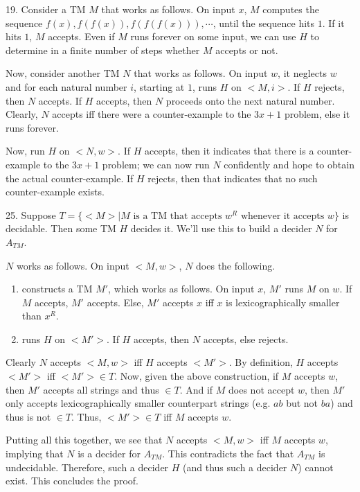 \documentclass{article}
\begin{document}
19. Consider a TM $M$ that works as follows. On input $x$, $M$ computes the sequence $f(x), f(f(x)), f(f(f(x))), \cdots$, until the sequence hits $1$. If it hits $1$, $M$ accepts. Even if $M$ runs forever on some input, we can use $H$ to determine in a finite number of steps whether $M$ accepts or not.

Now, consider another TM $N$ that works as follows. On input $w$, it neglects $w$ and for each natural number $i$, starting at $1$, runs $H$ on $<M, i>$. If $H$ rejects, then $N$ accepts. If $H$ accepts, then $N$ proceeds onto the next natural number. Clearly, $N$ accepts iff there were a counter-example to the $3x + 1$ problem, else it runs forever.

Now, run $H$ on $<N, w>$. If $H$ accepts, then it indicates that there is a counter-example to the $3x + 1$ problem; we can now run $N$ confidently and hope to obtain the actual counter-example. If $H$ rejects, then that indicates that no such counter-example exists.

25. Suppose $T = \{<M> \mid M \text{ is a TM that accepts } w^R \text{ whenever it accepts } w \}$ is decidable. Then some TM $H$ decides it. We'll use this to build a decider $N$ for $A_{TM}$.

$N$ works as follows. On input $<M, w>$, $N$ does the following.

\begin{enumerate}
    \item constructs a TM $M'$, which works as follows. On input $x$, $M'$ runs $M$ on $w$. If $M$ accepts, $M'$ accepts. Else, $M'$ accepts $x$ iff $x$ is lexicographically smaller than $x^R$.
    \item runs $H$ on $<M'>$. If $H$ accepts, then $N$ accepts, else rejects.
\end{enumerate}

Clearly $N$ accepts $<M, w>$ iff $H$ accepts $<M'>$. By definition, $H$ accepts $<M'>$ iff $<M'> \in T$. Now, given the above construction, if $M$ accepts $w$, then $M'$ accepts all strings and thus $\in T$. And if $M$ does not accept $w$, then $M'$ only accepts lexicographically smaller counterpart strings (e.g. $ab$ but not $ba$) and thus is not $\in T$. Thus, $<M'> \in T$ iff $M$ accepts $w$.

Putting all this together, we see that $N$ accepts $<M, w>$ iff $M$ accepts $w$, implying that $N$ is a decider for $A_{TM}$. This contradicts the fact that $A_{TM}$ is undecidable. Therefore, such a decider $H$ (and thus such a decider $N$) cannot exist. This concludes the proof.
\end{document}
